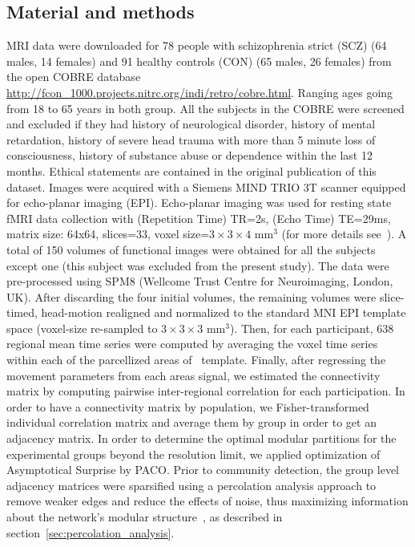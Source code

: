 \subsection{Material and methods}
MRI data were downloaded for 78 people with schizophrenia strict (SCZ) (64 males, 14 females) and 91 healthy controls (CON) (65 males, 26 females) from the open COBRE database \url{http://fcon_1000.projects.nitrc.org/indi/retro/cobre.html}.
Ranging ages going from 18 to 65 years in both group.
All the subjects in the COBRE were screened and excluded if they had history of neurological disorder, history of mental retardation, history of severe head trauma with more than 5 minute loss of consciousness, history of substance abuse or dependence within the last 12 months.
Ethical statements are contained in the original publication of this dataset.
Images were acquired with a Siemens MIND TRIO 3T scanner equipped for echo-planar imaging (EPI).
Echo-planar imaging was used for resting state fMRI data collection with (Repetition Time) TR=2s, (Echo Time) TE=29ms, matrix size: 64x64, slices=33, voxel size=$3 \times 3 \times 4$ mm$^3$ (for more details see~\cite{cetin2014}).
A total of 150 volumes of functional images were obtained for all the subjects except one (this subject was excluded from the present study).
The data were pre-processed using SPM8 (Wellcome Trust Centre for Neuroimaging, London, UK).
After discarding the four initial volumes, the remaining volumes were slice-timed, head-motion realigned and normalized to the standard MNI EPI template space (voxel-size re-sampled to $3 \times 3 \times 3$ mm$^3$).
Then, for each participant, 638 regional mean time series were computed by averaging the voxel time series within each of the parcellized areas of~\cite{crossley2013a} template. 
Finally, after regressing the movement parameters from each areas signal, we estimated the connectivity matrix by computing pairwise inter-regional correlation for each participation.
In order to have a connectivity matrix by population, we Fisher-transformed individual correlation matrix and average them by group in order to get an adjacency matrix.
In order to determine the optimal modular partitions for the experimental groups beyond the resolution limit, we applied optimization of Asymptotical Surprise by PACO.
Prior to community detection, the group level adjacency matrices were sparsified using a percolation analysis approach to remove weaker edges and reduce the effects of noise, thus maximizing information about the network's modular structure~\cite{nicolini2017,bardella2016a,gallos2012}, as described in section~\ref{sec:percolation_analysis}.
